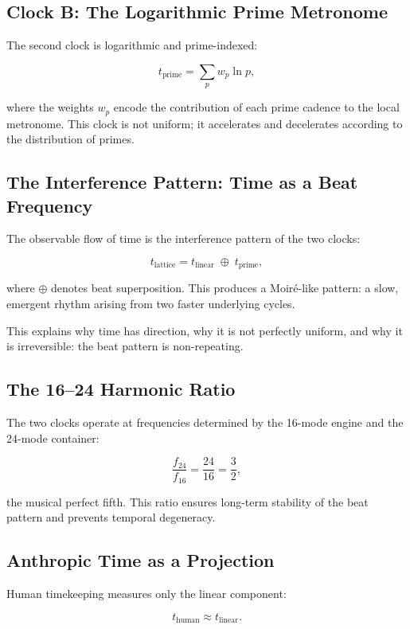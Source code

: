 \documentclass[12pt,oneside]{book}
\begin{document}
\subsection{Clock B: The Logarithmic Prime Metronome}

The second clock is logarithmic and prime-indexed:


\[
t_{\text{prime}} = \sum_{p} w_p \ln p,
\]


where the weights \(w_p\) encode the contribution of each prime cadence to the local
metronome. This clock is not uniform; it accelerates and decelerates according to the
distribution of primes.

\subsection{The Interference Pattern: Time as a Beat Frequency}

The observable flow of time is the interference pattern of the two clocks:


\[
t_{\text{lattice}} = t_{\text{linear}} \;\oplus\; t_{\text{prime}},
\]


where \(\oplus\) denotes beat superposition. This produces a Moiré-like pattern: a slow,
emergent rhythm arising from two faster underlying cycles.

This explains why time has direction, why it is not perfectly uniform, and why it is
irreversible: the beat pattern is non-repeating.

\subsection{The 16--24 Harmonic Ratio}

The two clocks operate at frequencies determined by the 16-mode engine and the
24-mode container:


\[
\frac{f_{24}}{f_{16}} = \frac{24}{16} = \frac{3}{2},
\]


the musical perfect fifth. This ratio ensures long-term stability of the beat pattern and
prevents temporal degeneracy.

\subsection{Anthropic Time as a Projection}

Human timekeeping measures only the linear component:


\[
t_{\text{human}} \approx t_{\text{linear}}.
\]
\end{document}
